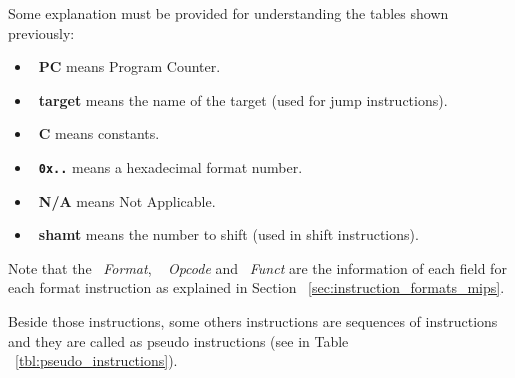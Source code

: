 \documentclass[
  oneside,
  11pt, a4paper,
  footinclude=true,
  headinclude=true,
  cleardoublepage=empty
]{scrbook}
\begin{document}
\newpage
Some explanation must be provided for understanding the tables shown previously:
\begin{itemize}
\item ~\textbf{PC} means Program Counter.
\item ~\textbf{target} means the name of the target (used for jump instructions).
\item ~\textbf{C} means constants.
\item ~\textbf{\texttt{0x..}} means a hexadecimal format number.
\item ~\textbf{N/A} means Not Applicable.
\item ~\textbf{shamt} means the number to shift (used in shift instructions).
\end{itemize} 
Note that the ~\textit{Format}, ~\textit{ Opcode} and ~\textit{Funct} are the information of each field for each format instruction as explained in Section ~\ref{sec:instruction_formats_mips}.

Beside those instructions, some others instructions are sequences of instructions and they are called as pseudo instructions (see in Table ~\ref{tbl:pseudo_instructions}).
\end{document}
